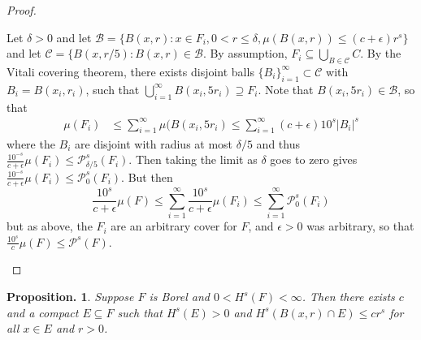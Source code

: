 \documentclass[11pt, a4paper]{memoir}
\theoremstyle{change}
\newtheorem{proposition}[theorem]{Proposition.}
\theoremstyle{plain}
\theoremstyle{nonumberplain}
\newtheorem{proof}{Proof}
\numberwithin{equation}{section}
\begin{document}
\begin{proof}
\begin{enumerate}[nl,r]
            Let $\delta>0$ and let $\mathcal{B}=\{B(x,r):x\in F_i,0<r\leq\delta,\mu(B(x,r))\leq(c+\epsilon)r^s\}$ and let $\mathcal{C}=\{B(x,r/5):B(x,r)\in\mathcal{B}$.
            By assumption, $F_i\subseteq\bigcup_{B\in\mathcal{C}}C$.
            By the Vitali covering theorem, there exists disjoint balls $\{B_i\}_{i=1}^\infty\subset\mathcal{C}$ with $B_i=B(x_i,r_i)$, such that $\bigcup_{i=1}^\infty B(x_i,5r_i)\supseteq F_i$.
            Note that $B(x_i,5r_i)\in\mathcal{B}$, so that
            \begin{align*}
                \mu(F_i) &\leq \sum_{i=1}^\infty\mu(B(x_i,5r_i)\leq\sum_{i=1}^\infty(c+\epsilon)10^s|B_i|^s
            \end{align*}
            where the $B_i$ are disjoint with radius at most $\delta/5$ and thus $\frac{10^{-s}}{c+\epsilon}\mu(F_i)\leq \mathcal{P}_{\delta/5}^s(F_i)$.
            Then taking the limit as $\delta$ goes to zero gives $\frac{10^{-s}}{c+\epsilon}\mu(F_i)\leq \mathcal{P}_0^s(F_i)$.
            But then
            \begin{equation*}
                \frac{10^s}{c+\epsilon}\mu(F)\leq\sum_{i=1}^\infty\frac{10^s}{c+\epsilon}\mu(F_i)\leq\sum_{i=1}^\infty\mathcal{P}_0^s(F_i)
            \end{equation*}
            but as above, the $F_i$ are an arbitrary cover for $F$, and $\epsilon>0$ was arbitrary, so that $\frac{10^s}{c}\mu(F)\leq\mathcal{P}^s(F)$.
    \end{enumerate}
\end{proof}
\begin{proposition}
    Suppose $F$ is Borel and $0<H^s(F)<\infty$.
    Then there exists $c$ and a compact $E\subseteq F$ such that $H^s(E)>0$ and $H^s(B(x,r)\cap E)\leq cr^s$ for all $x\in E$ and $r>0$.
\end{proposition}
\end{document}

